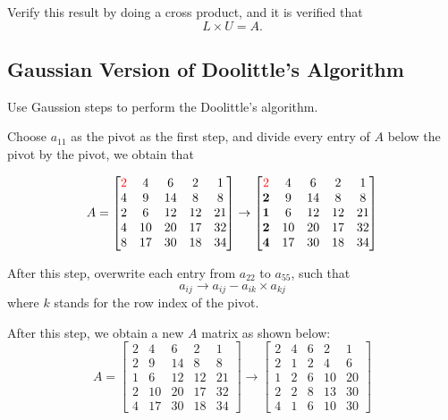 \documentclass[a4paper,titlepage]{article}
\begin{document}
		Verify this result by doing a cross product, and it is verified that 
		$$
			L \times U = A.
		$$
		
	\subsection{Gaussian Version of Doolittle's Algorithm}
		Use Gaussion steps to perform the Doolittle's algorithm. 
		
		Choose $a_{11}$ as the pivot as the first step, and divide every entry of $A$ below the pivot by the pivot, we obtain that
		
		$$
			A = \begin{bmatrix}
				\textcolor{red}{2} & 4 & 6 & 2 & 1\\
				4 & 9 & 14 & 8 & 8\\
				2 & 6 & 12 & 12 & 21\\
				4 & 10 & 20 & 17 & 32\\
				8 & 17 & 30 & 18 & 34
			\end{bmatrix} \rightarrow \begin{bmatrix}
				\textcolor{red}{2} & 4 & 6 & 2 & 1\\
				\textbf{2} & 9 & 14 & 8 & 8\\
				\textbf{1} & 6 & 12 & 12 & 21\\
				\textbf{2} & 10 & 20 & 17 & 32\\
				\textbf{4} & 17 & 30 & 18 & 34
			\end{bmatrix}
		$$
		
		After this step, overwrite each entry from $a_{22}$ to $a_{55}$, such that 
		$$
			a_{ij} \rightarrow a_{ij} - a_{ik} \times a_{kj}
		$$
		where $k$ stands for the row index of the pivot. 
		
		After this step, we obtain a new $A$ matrix as shown below:
		$$
			A = \begin{bmatrix}
				2 & 4 & 6 & 2 & 1\\
				2 & 9 & 14 & 8 & 8\\
				1 & 6 & 12 & 12 & 21\\
				2 & 10 & 20 & 17 & 32\\
				4 & 17 & 30 & 18 & 34
			\end{bmatrix} \rightarrow \begin{bmatrix}				
				2 & 4 & 6 & 2 & 1\\
				2 & 1 & 2 & 4 & 6\\
				1 & 2 & 6 & 10 & 20\\
				2 & 2 & 8 & 13 & 30\\
				4 & 1 & 6 & 10 & 30
			\end{bmatrix}
		$$
		
\end{document}
